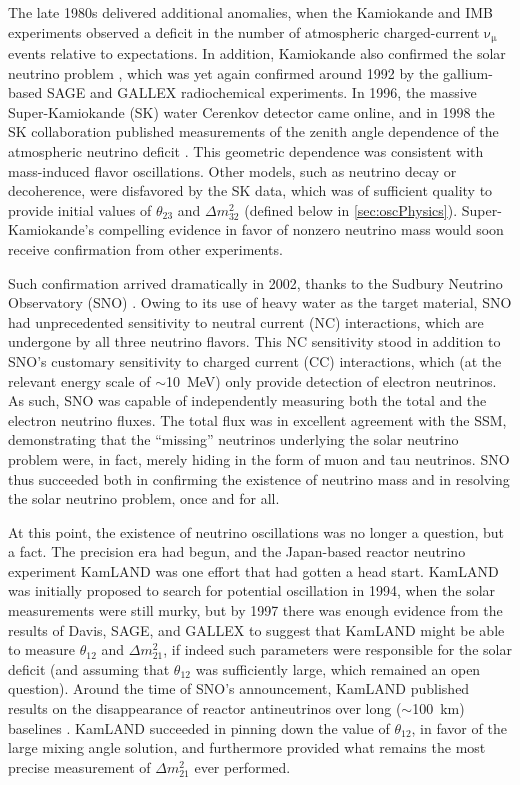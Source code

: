 \documentclass[../thesis.tex]{subfiles}
\begin{document}
The late 1980s delivered additional anomalies, when the Kamiokande \cite{HIRATA1988416} and IMB \cite{PhysRevLett.66.2561} experiments observed a deficit in the number of atmospheric charged-current \(\mathrm{\nu_\mu}\) events relative to expectations. In addition, Kamiokande also confirmed the solar neutrino problem \cite{SUZUKI199554}, which was yet again confirmed around 1992 by the gallium-based SAGE \cite{GAVRIN200136} and GALLEX \cite{VIGNAUD199820} radiochemical experiments. In 1996, the massive Super-Kamiokande (SK) water Cerenkov detector came online, and in 1998 the SK collaboration published measurements of the zenith angle dependence of the atmospheric neutrino deficit \cite{PhysRevLett.81.1562}. This geometric dependence was consistent with mass-induced flavor oscillations. Other models, such as neutrino decay or decoherence, were disfavored by the SK data, which was of sufficient quality to provide initial values of \(\theta_{23}\) and \(\Delta m^2_{32}\) (defined below in \autoref{sec:oscPhysics}). Super-Kamiokande's compelling evidence in favor of nonzero neutrino mass would soon receive confirmation from other experiments.

Such confirmation arrived dramatically in 2002, thanks to the Sudbury Neutrino Observatory (SNO) \cite{PhysRevLett.89.011301}. Owing to its use of heavy water as the target material, SNO had unprecedented sensitivity to neutral current (NC) interactions, which are undergone by all three neutrino flavors. This NC sensitivity stood in addition to SNO's customary sensitivity to charged current (CC) interactions, which (at the relevant energy scale of $\sim$10~MeV) only provide detection of electron neutrinos. As such, SNO was capable of independently measuring both the total and the electron neutrino fluxes. The total flux was in excellent agreement with the SSM, demonstrating that the ``missing'' neutrinos underlying the solar neutrino problem were, in fact, merely hiding in the form of muon and tau neutrinos. SNO thus succeeded both in confirming the existence of neutrino mass and in resolving the solar neutrino problem, once and for all.

At this point, the existence of neutrino oscillations was no longer a question, but a fact. The precision era had begun, and the Japan-based reactor neutrino experiment KamLAND was one effort that had gotten a head start. KamLAND was initially proposed to search for potential oscillation in 1994, when the solar measurements were still murky, but by 1997 there was enough evidence from the results of Davis, SAGE, and GALLEX to suggest that KamLAND might be able to measure $\theta_{12}$ and $\Delta m^2_{21}$, if indeed such parameters were responsible for the solar deficit (and assuming that $\theta_{12}$ was sufficiently large, which remained an open question). Around the time of SNO's announcement, KamLAND published results on the disappearance of reactor antineutrinos over long ($\sim$100~km) baselines \cite{PhysRevLett.90.021802}. KamLAND succeeded in pinning down the value of $\theta_{12}$, in favor of the large mixing angle solution, and furthermore provided what remains the most precise measurement of \(\Delta m^2_{21}\) ever performed.
\end{document}
